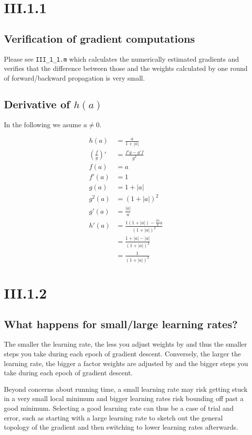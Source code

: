 \section*{III.1.1}
\subsection*{Verification of gradient computations}
Please see \texttt{III\_1\_1.m} which calculates the
numerically estimated gradients and verifies that the
difference between those and the weights calculated by
one round of forward/backward propagation is very small.

\subsection*{Derivative of $h(a)$}
In the following we asume $a\neq0$.

\begin{align*}
  h(a) &= \frac{a}{1 + |a|} \\
  \left(\frac{f}{g}\right)' &= \frac{f'g - g'f}{g^2} \\
  f(a) &= a \\
  f'(a) &= 1 \\
  g(a) &= 1 + |a| \\
  g^2(a) &= (1 + |a|)^2 \\
  g'(a) &= \frac{|a|}{a} \\
  h'(a) &= \frac{1(1 + |a|) - \frac{|a|}{a}a}{(1 + |a|)^2} \\
        &= \frac{1 + |a| - |a|}{(1 + |a|)^2} \\
        &= \frac{1}{(1 + |a|)^2}
\end{align*}

\section*{III.1.2}
\subsection*{What happens for small/large learning rates?}
The smaller the learning rate, the less you adjust weights by and thus the smaller
steps you take during each epoch of gradient descent. Conversely, the larger the learning rate, 
the bigger a factor weights are adjusted by and the bigger steps you take during each epoch of
gradient descent.

Beyond concerns about running time, a small learning rate may risk getting stuck in a very small
local minimum and bigger learning rates risk bounding off past a good minimum. Selecting a good
learning rate can thus be a case of trial and error, such as starting with a large learning rate
to sketch out the general topology of the gradient and then switching to lower learning rates
afterwards.

